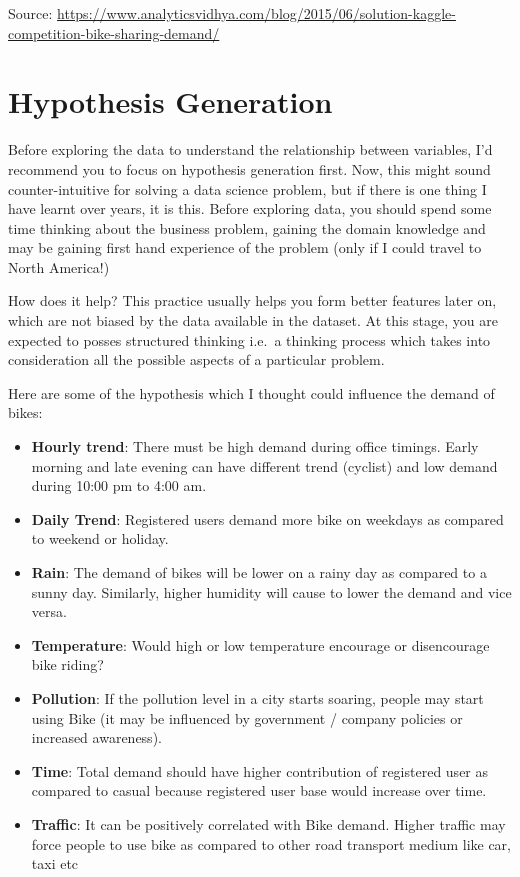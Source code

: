 \documentclass[]{book}
\begin{document}
Source: \url{https://www.analyticsvidhya.com/blog/2015/06/solution-kaggle-competition-bike-sharing-demand/}

\hypertarget{hypothesis-generation}{%
\section{Hypothesis Generation}\label{hypothesis-generation}}

Before exploring the data to understand the relationship between variables, I'd recommend you to focus on hypothesis generation first. Now, this might sound counter-intuitive for solving a data science problem, but if there is one thing I have learnt over years, it is this. Before exploring data, you should spend some time thinking about the business problem, gaining the domain knowledge and may be gaining first hand experience of the problem (only if I could travel to North America!)

How does it help? This practice usually helps you form better features later on, which are not biased by the data available in the dataset. At this stage, you are expected to posses structured thinking i.e.~a thinking process which takes into consideration all the possible aspects of a particular problem.

Here are some of the hypothesis which I thought could influence the demand of bikes:

\begin{itemize}
\item
  \textbf{Hourly trend}: There must be high demand during office timings. Early morning and late evening can have different trend (cyclist) and low demand during 10:00 pm to 4:00 am.
\item
  \textbf{Daily Trend}: Registered users demand more bike on weekdays as compared to weekend or holiday.
\item
  \textbf{Rain}: The demand of bikes will be lower on a rainy day as compared to a sunny day. Similarly, higher humidity will cause to lower the demand and vice versa.
\item
  \textbf{Temperature}: Would high or low temperature encourage or disencourage bike riding?
\item
  \textbf{Pollution}: If the pollution level in a city starts soaring, people may start using Bike (it may be influenced by government / company policies or increased awareness).
\item
  \textbf{Time}: Total demand should have higher contribution of registered user as compared to casual because registered user base would increase over time.
\item
  \textbf{Traffic}: It can be positively correlated with Bike demand. Higher traffic may force people to use bike as compared to other road transport medium like car, taxi etc
\end{itemize}
\end{document}
